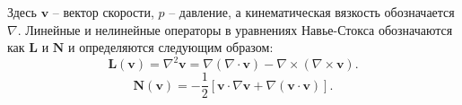Здесь $\textbf{v}$ -- вектор скорости, $p$ -- давление, а кинематическая вязкость обозначается $\nabla$. 
%
Линейные и нелинейные операторы в уравнениях Навье-Стокса обозначаются как $\textbf{L}$ и $\textbf{N}$ 
и определяются следующим образом:
%
\begin{equation*}
    \textbf{L} (\textbf{v}) = \nabla^2 \textbf{v} = \nabla(\nabla \cdot \textbf{v}) - 
    \nabla \times (\nabla \times \textbf{v}).
\end{equation*}
%
\begin{equation*}
    \textbf{N} (\textbf{v}) = - \frac{1}{2}[\textbf{v} \cdot \nabla \textbf{v} + 
    \nabla (\textbf{v} \cdot \textbf{v})]. 
\end{equation*}
%











